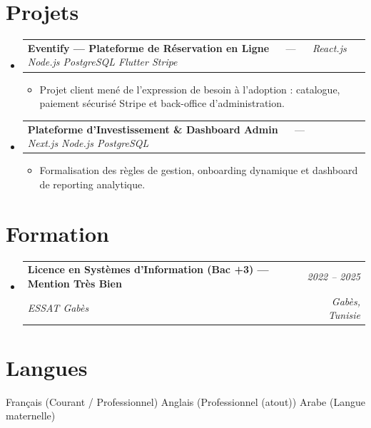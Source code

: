 \documentclass[letterpaper,9pt]{article}
\makeatletter
\newcommand{\resumeItem}[1]{\item\small{#1}}
\newcommand{\resumeSubheading}[4]{
  \vspace{-1pt}\item
  \begin{tabular*}{0.97\textwidth}[t]{l@{\extracolsep{\fill}}r}
    \textbf{#1} & \textit{\color{greytext}#2} \\
    \textit{\small\color{greytext} #3} & \textit{\small\color{greytext} #4}
  \end{tabular*}\vspace{-2pt}
}
\newcommand{\resumeProjectHeading}[2]{
  \item
  \begin{tabular*}{0.97\textwidth}{l@{\extracolsep{\fill}}r}
    \small #1 & #2
  \end{tabular*}\vspace{-1pt}
}
\newcommand{\resumeSubHeadingListStart}{\begin{itemize}[leftmargin=0.18in, label={}, itemsep=1.2pt, topsep=2.5pt, parsep=0pt]}
\newcommand{\resumeSubHeadingListEnd}{\end{itemize}\vspace{-2pt}}
\newcommand{\resumeProjectListStart}{\begin{itemize}[leftmargin=0.24in, label={}, itemsep=0.9pt, topsep=1.2pt, parsep=0pt]}
\newcommand{\resumeProjectListEnd}{\end{itemize}\vspace{-2pt}}
\makeatother
\begin{document}
\section{Projets}
\resumeSubHeadingListStart

  \resumeProjectHeading{\textbf{Eventify --- Plateforme de Réservation en Ligne} $\quad$ --- $\quad$ \emph{\color{greytext}React.js \textperiodcentered{} Node.js \textperiodcentered{} PostgreSQL \textperiodcentered{} Flutter \textperiodcentered{} Stripe}}{}
    \resumeProjectListStart
      \resumeItem{Projet client mené de l'expression de besoin à l'adoption : catalogue, paiement sécurisé Stripe et back-office d'administration.}
    \resumeProjectListEnd

  \resumeProjectHeading{\textbf{Plateforme d'Investissement \& Dashboard Admin} $\quad$ --- $\quad$ \emph{\color{greytext}Next.js \textperiodcentered{} Node.js \textperiodcentered{} PostgreSQL}}{}
    \resumeProjectListStart
      \resumeItem{Formalisation des règles de gestion, onboarding dynamique et dashboard de reporting analytique.}
    \resumeProjectListEnd

\resumeSubHeadingListEnd\vspace{-3pt}

\section{Formation}
\resumeSubHeadingListStart
  \resumeSubheading{Licence en Systèmes d'Information (Bac +3) --- Mention Très Bien}{2022 -- 2025}{ESSAT Gabès}{Gabès, Tunisie}
\resumeSubHeadingListEnd\vspace{-1pt}

\section{Langues}
\begin{itemize}[leftmargin=0.18in, label={}, topsep=2pt, itemsep=1pt, parsep=0pt]
\footnotesize{
  \item Français (Courant / Professionnel) \textperiodcentered{} Anglais (Professionnel (atout)) \textperiodcentered{} Arabe (Langue maternelle)
}
\end{itemize}
\end{document}
